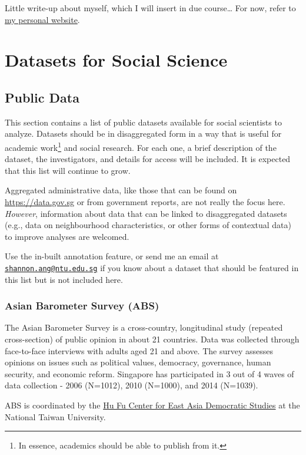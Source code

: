 \documentclass[openany]{book}
\let\rmarkdownfootnote\footnote%
\def\footnote{\protect\rmarkdownfootnote}
\begin{document}
Little write-up about myself, which I will insert in due course\ldots{}
For now, refer to \href{https://www.shannonang.net}{my personal
website}.

\part{Datasets for Social
Science}\label{part-datasets-for-social-science}

\chapter{Public Data}\label{publicdata}

This section contains a list of public datasets available for social
scientists to analyze. Datasets should be in disaggregated form in a way
that is useful for academic work\footnote{In essence, academics should
  be able to publish from it.} and social research. For each one, a
brief description of the dataset, the investigators, and details for
access will be included. It is expected that this list will continue to
grow.

Aggregated administrative data, like those that can be found on
\url{https://data.gov.sg} or from government reports, are not really the
focus here. \emph{However}, information about data that can be linked to
disaggregated datasets (e.g., data on neighbourhood characteristics, or
other forms of contextual data) to improve analyses are welcomed.

Use the in-built annotation feature, or send me an email at
\href{mailto:shannon.ang@ntu.edu.sg}{\nolinkurl{shannon.ang@ntu.edu.sg}}
if you know about a dataset that should be featured in this list but is
not included here.

\section{Asian Barometer Survey (ABS)}\label{abs}

The Asian Barometer Survey is a cross-country, longitudinal study
(repeated cross-section) of public opinion in about 21 countries. Data
was collected through face-to-face interviews with adults aged 21 and
above. The survey assesses opinions on issues such as political values,
democracy, governance, human security, and economic reform. Singapore
has participated in 3 out of 4 waves of data collection - 2006 (N=1012),
2010 (N=1000), and 2014 (N=1039).

ABS is coordinated by the
\href{http://www.asianbarometer.org/structure}{Hu Fu Center for East
Asia Democratic Studies} at the National Taiwan University.
\end{document}
